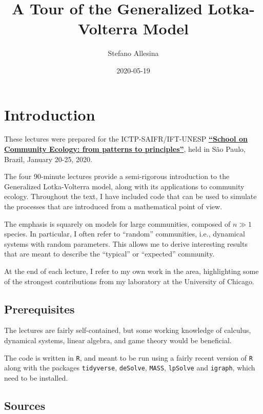 \documentclass[
]{book}
\title{A Tour of the Generalized Lotka-Volterra Model}
\author{Stefano Allesina}
\date{2020-05-19}
\begin{document}
\maketitle

{
\setcounter{tocdepth}{1}
\tableofcontents
}
\hypertarget{introduction}{%
\chapter{Introduction}\label{introduction}}

These lectures were prepared for the ICTP-SAIFR/IFT-UNESP \href{https://www.ictp-saifr.org/community-ecology-from-patterns-to-principles/}{\textbf{``School on Community Ecology: from patterns to principles''}}, held in São Paulo, Brazil, January 20-25, 2020.

The four 90-minute lectures provide a semi-rigorous introduction to the Generalized Lotka-Volterra model, along with its applications to community ecology. Throughout the text, I have included code that can be used to simulate the processes that are introduced from a mathematical point of view.

The emphasis is squarely on models for large communities, composed of \(n \gg 1\) species. In particular, I often refer to ``random'' communities, i.e., dynamical systems with random parameters. This allows me to derive interesting results that are meant to describe the ``typical'' or ``expected'' community.

At the end of each lecture, I refer to my own work in the area, highlighting some of the strongest contributions from my laboratory at the University of Chicago.

\hypertarget{prerequisites}{%
\section{Prerequisites}\label{prerequisites}}

The lectures are fairly self-contained, but some working knowledge of calculus, dynamical systems, linear algebra, and game theory would be beneficial.

The code is written in \texttt{R}, and meant to be run using a fairly recent version of \texttt{R} along with the packages \texttt{tidyverse}, \texttt{deSolve}, \texttt{MASS}, \texttt{lpSolve} and \texttt{igraph}, which need to be installed.

\hypertarget{sources}{%
\section{Sources}\label{sources}}
\end{document}
